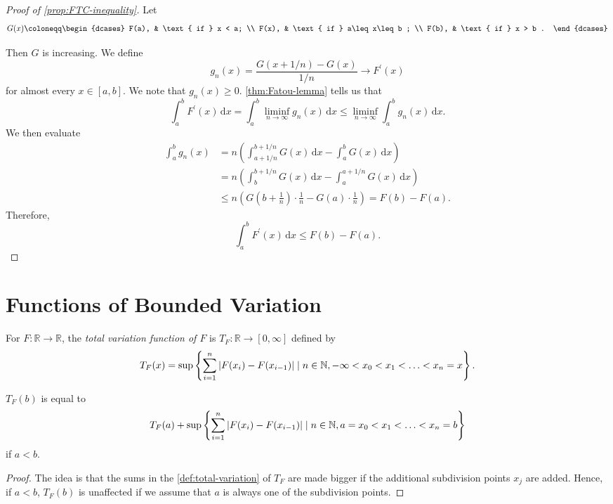 \begin{proof}[Proof of \autoref{prop:FTC-inequality}]
	Let
	\[
		G(x)\coloneqq \begin{dcases}
			F(a), & \text{ if } x < a;          \\
			F(x), & \text{ if } a\leq x\leq b ; \\
			F(b), & \text{ if } x > b .
		\end{dcases}
	\]

	Then \(G\) is increasing. We define
	\[
		g_n(x) = \frac{G(x+1/n)- G(x)}{1/n} \to F^\prime (x)
	\]
	for almost every \(x \in [a,b]\). We note that \(g_n(x) \geq 0\). \autoref{thm:Fatou-lemma} tells us that
	\[
		\int_a^b F^\prime (x) \,\mathrm{d} x = \int_a^b \liminf_{n \to \infty} g_n(x) \,\mathrm{d} x \leq \liminf_{n \to \infty} \int_a^b g_n(x) \,\mathrm{d} x.
	\]
	We then evaluate
	\[
		\begin{split}
			\int_a^b g_n(x) &= n\left( \int_{a+1/n}^{b+1/n} G(x) \,\mathrm{d} x - \int_a^b G(x) \,\mathrm{d} x \right)  \\
			&= n\left( \int_b^{b+1/n} G(x) \,\mathrm{d} x - \int_a^{a+1/n} G(x) \,\mathrm{d} x \right) \\
			&\leq n\left( G\left( b + \frac{1}{n} \right) \cdot \frac{1}{n} - G(a) \cdot \frac{1}{n}  \right)
			= F(b) - F(a).
		\end{split}
	\]
	Therefore,
	\[
		\int_a^b F^\prime (x) \,\mathrm{d} x \leq F(b) - F(a).
	\]
\end{proof}

\section{Functions of Bounded Variation}
\begin{definition}\label{def:total-variation-function}
	For \(F \colon \mathbb{R} \to \mathbb{R}\), the \emph{total variation function of \(F\)} is \(T_F \colon \mathbb{R} \to [0,\infty]\) defined by
	\[
		T_F(x) = \sup \left\{\sum_{i=1}^n \left\vert F(x_i) - F(x_{i-1}) \right\vert \mid n \in \mathbb{\MakeUppercase{n}}, -\infty < x_0 < x_1 < \ldots < x_n = x\right\}.
	\]
\end{definition}

\begin{lemma}\label{lma:lec34-1}
	\(T_F(b)\) is equal to
	\[
		T_F(a) + \sup \left\{\sum_{i=1}^n \left\vert F(x_i) - F(x_{i-1}) \right\vert \mid n \in \mathbb{\MakeUppercase{n}}, a = x_0 < x_1 < \ldots < x_n = b\right\}
	\]
	if \(a < b\).
\end{lemma}
\begin{proof}
	The idea is that the sums in the \autoref{def:total-variation} of \(T_F\) are made bigger if the additional subdivision points \(x_{j} \) are added. Hence,
	if \(a <b\), \(T_F(b)\) is unaffected if we assume that \(a\) is always one of the subdivision points.
\end{proof}

